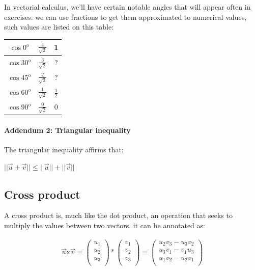 \documentclass[11pt,fleqn]{book} %
\begin{document}
In vectorial calculus, we'll have certain notable angles that will appear often in exercises.
we can use fractions to get them approximated to numerical values, such values are listed on this table:

\begin{center}
    \begin{tabular}{||c c c||} 
     \hline
     $ \cos 0^o $ & $ \frac{4}{\sqrt{2}} $ & 1\\ [0.5ex] 
     \hline
     $ \cos 30^o $ & $ \frac{3}{\sqrt{2}} $ & ?\\ [0.5ex] 
     \hline
     $ \cos 45^o $ & $ \frac{2}{\sqrt{2}} $ & ?\\ [0.5ex] 
     \hline
     $ \cos 60^o $ & $ \frac{1}{\sqrt{2}} $ & $ \frac{1}{2} $\\ [0.5ex] 
     \hline
     $ \cos 90^o $ & $ \frac{0}{\sqrt{2}} $ & 0\\ [0.5ex] 
     \hline
    
    \end{tabular}
    \end{center}

\paragraph*{Addendum 2: Triangular inequality}

The triangular inequality affirms that:

$ ||\vec{u}+\vec{v}|| \le ||\vec{u}||+||\vec{v}|| $

\subsection{Cross product}

A cross product is, much like the dot product, an operation that seeks to multiply the values between
two vectors. it can be annotated as:

\begin{gather}
    \vec{u} \text{x} \vec{v} = 
    \begin{pmatrix}
        u_1 \\
        u_2 \\
        u_3 \\
    \end{pmatrix}
    *
    \begin{pmatrix}
        v_1\\
        v_2\\
        v_3\\ 
    \end{pmatrix}
    =
    \begin{pmatrix}
        u_2 v_3 - u_3 v_2\\
        u_3 v_1 - v_1 u_3\\
        u_1 v_2 - u_2 v_1 \\ 
    \end{pmatrix}
\end{gather}
\end{document}
